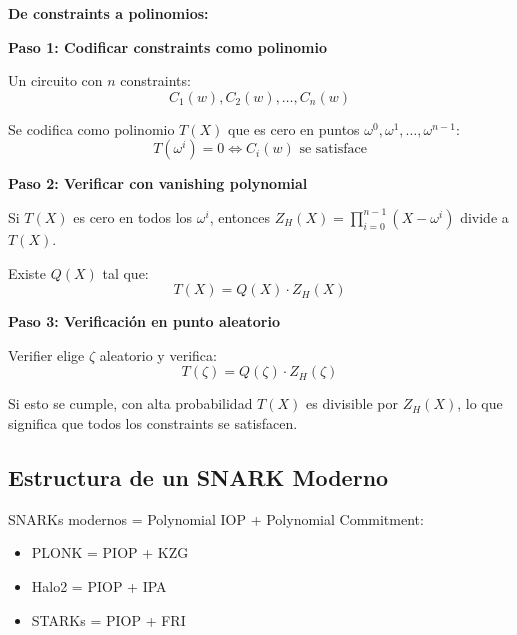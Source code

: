 \documentclass[11pt,a4paper,twoside]{book}
\begin{document}
\begin{mathnote}
\textbf{De constraints a polinomios:}

\textbf{Paso 1: Codificar constraints como polinomio}

Un circuito con $n$ constraints:
\[ C_1(w), C_2(w), \ldots, C_n(w) \]

Se codifica como polinomio $T(X)$ que es cero en puntos $\omega^0, \omega^1, \ldots, \omega^{n-1}$:
\[ T(\omega^i) = 0 \iff C_i(w) \text{ se satisface} \]

\textbf{Paso 2: Verificar con vanishing polynomial}

Si $T(X)$ es cero en todos los $\omega^i$, entonces $Z_H(X) = \prod_{i=0}^{n-1}(X - \omega^i)$ divide a $T(X)$.

Existe $Q(X)$ tal que:
\[ T(X) = Q(X) \cdot Z_H(X) \]

\textbf{Paso 3: Verificaci\'on en punto aleatorio}

Verifier elige $\zeta$ aleatorio y verifica:
\[ T(\zeta) = Q(\zeta) \cdot Z_H(\zeta) \]

Si esto se cumple, con alta probabilidad $T(X)$ es divisible por $Z_H(X)$, lo que significa que todos los constraints se satisfacen.
\end{mathnote}

\subsection{Estructura de un SNARK Moderno}

SNARKs modernos = Polynomial IOP + Polynomial Commitment:
\begin{itemize}
    \item PLONK = PIOP + KZG
    \item Halo2 = PIOP + IPA
    \item STARKs = PIOP + FRI
\end{itemize}
\end{document}
